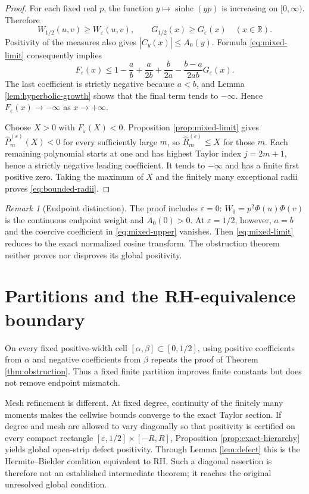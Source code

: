 \documentclass[11pt]{amsart}
\theoremstyle{remark}
\newtheorem{remark}[theorem]{Remark}
\newcommand{\sinhc}{\operatorname{sinhc}}
\newcommand{\R}{\mathbb{R}}
\begin{document}
\begin{proof}
For each fixed real $p$, the function $y\mapsto\sinhc(yp)$ is increasing on
$[0,\infty)$.  Therefore
\[
W_{1/2}(u,v)\geq W_\varepsilon(u,v),
\qquad G_{1/2}(x)\geq G_\varepsilon(x)\quad(x\in\R).
\]
Positivity of the measures also gives $|C_y(x)|\leq A_0(y)$.  Formula
\eqref{eq:mixed-limit} consequently implies
\begin{equation}\label{eq:mixed-upper}
F_\varepsilon(x)
\leq 1-\frac ab+\frac{a}{2b}+\frac{b}{2a}
-\frac{b-a}{2ab}G_\varepsilon(x).
\end{equation}
The last coefficient is strictly negative because $a<b$, and Lemma
\ref{lem:hyperbolic-growth} shows that the final term tends to $-\infty$.
Hence $F_\varepsilon(x)\to-\infty$ as $x\to+\infty$.

Choose $X>0$ with $F_\varepsilon(X)<0$.  Proposition
\ref{prop:mixed-limit} gives
$\widehat P_m^{(\varepsilon)}(X)<0$ for every sufficiently large $m$, so
$\widehat R_m^{(\varepsilon)}\leq X$ for those $m$.  Each remaining
polynomial starts at one and has highest Taylor index $j=2m+1$, hence a
strictly negative leading coefficient.  It tends to $-\infty$ and has a
finite first positive zero.  Taking the maximum of $X$ and the finitely many
exceptional radii proves \eqref{eq:bounded-radii}.
\end{proof}

\begin{remark}[Endpoint distinction]\label{rem:endpoint}
The proof includes $\varepsilon=0$: $W_0=p^2\Phi(u)\Phi(v)$ is the continuous
endpoint weight and $A_0(0)>0$.  At $\varepsilon=1/2$, however, $a=b$ and
the coercive coefficient in \eqref{eq:mixed-upper} vanishes.  Then
\eqref{eq:mixed-limit} reduces to the exact normalized cosine transform.
The obstruction theorem neither proves nor disproves its global positivity.
\end{remark}

\section{Partitions and the RH-equivalence boundary}

On every fixed positive-width cell $[\alpha,\beta]\subset[0,1/2]$, using
positive coefficients from $\alpha$ and negative coefficients from $\beta$
repeats the proof of Theorem \ref{thm:obstruction}.  Thus a fixed finite
partition improves finite constants but does not remove endpoint mismatch.

Mesh refinement is different.  At fixed degree, continuity of the finitely
many moments makes the cellwise bounds converge to the exact Taylor section.
If degree and mesh are allowed to vary diagonally so that positivity is
certified on every compact rectangle
$[\varepsilon,1/2]\times[-R,R]$, Proposition
\ref{prop:exact-hierarchy} yields global open-strip defect positivity.
Through Lemma \ref{lem:defect} this is the Hermite--Biehler condition
equivalent to RH.  Such a diagonal assertion is therefore not an established
intermediate theorem; it reaches the original unresolved global condition.
\end{document}
